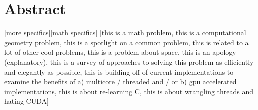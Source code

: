 \documentclass[12pt,twoside]{reedthesis}
\begin{document}








    \tableofcontents
    \listofalgorithms
    \listoffigures

    \chapter*{Abstract}
    [more specifics][math specifics]
    [this is a math problem, this is a computational geometry problem, this is a spotlight on a common problem, this is related to a lot of other cool problems, this is a problem about space, this is an apology (explanatory), this is a survey of approaches to solving this problem as efficiently and elegantly as possible, this is building off of current implementations to examine the benefits of a) multicore / threaded and / or b) gpu accelerated implementations, this is about re-learning C, this is about wrangling threads and hating CUDA]
	
\end{document}
